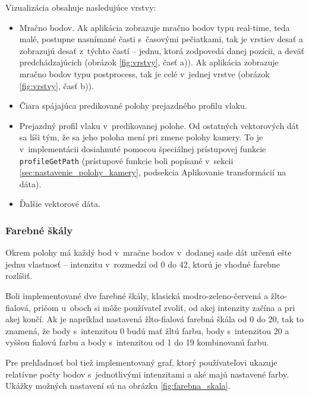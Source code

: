 Vizualizácia obsahuje nasledujúce vrstvy:
\begin{itemize}
    \item Mračno bodov. Ak aplikácia zobrazuje mračno bodov typu real-time, teda malé, postupne nasnímané časti s~časovými pečiatkami, tak je vrstiev desať a zobrazujú desať z~týchto častí -- jednu, ktorá zodpovedá danej pozícii, a deväť predchádzajúcich (obrázok \ref{fig:vrstvy}, časť a)). Ak aplikácia zobrazuje mračno bodov typu postprocess, tak je celé v~jednej vrstve (obrázok \ref{fig:vrstvy}, časť b)).
    \item Čiara spájajúca predikované polohy prejazdného profilu vlaku.
    \item Prejazdný profil vlaku v~predikovanej polohe. Od ostatných vektorových dát sa líši tým, že sa jeho poloha mení pri zmene polohy kamery. To je v~implementácii dosiahnuté pomocou špeciálnej prístupovej funkcie \texttt{profileGetPath} (prístupové funkcie boli popísané v~sekcii \ref{sec:nastavenie_polohy_kamery}, podsekcia Aplikovanie transformácií na dáta). 
    \item Ďalšie vektorové dáta.
\end{itemize}

\subsubsection{Farebné škály}

Okrem polohy má každý bod v~mračne bodov v~dodanej sade dát určenú ešte jednu vlastnosť -- intenzitu v~rozmedzí od 0 do 42, ktorú je vhodné farebne rozlíšiť.

Boli implementované dve farebné škály, klasická modro-zeleno-červená a žlto-fialová, pričom u~oboch si môže používateľ zvoliť, od akej intenzity začína a pri akej končí. Ak je napríklad nastavená žlto-fialová farebná škála od 0 do 20, tak to znamená, že body s~intenzitou 0 budú mať žltú farbu, body s~intenzitou 20 a vyššou fialovú farbu a body s~intenzitou od 1 do 19 kombinovanú farbu.

Pre prehľadnosť bol tiež implementovaný graf, ktorý používateľovi ukazuje relatívne počty bodov s~jednotlivými intenzitami a aké majú nastavené farby. Ukážky možných nastavení sú na obrázku \ref{fig:farebna_skala}.

